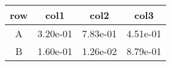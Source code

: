 \begin{tabular}{cccc}
\toprule
row&col1&col2&col3\tabularnewline
\midrule
A&3.20e-01&7.83e-01&4.51e-01\tabularnewline
B&1.60e-01&1.26e-02&8.79e-01\tabularnewline
\bottomrule
\end{tabular}
